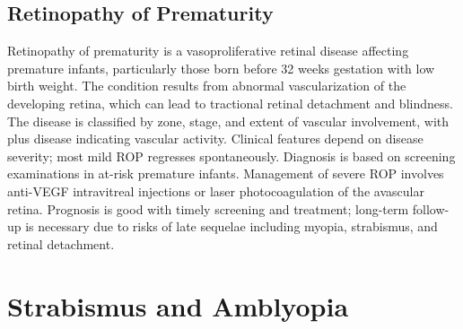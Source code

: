 \subsection{Retinopathy of Prematurity}
\label{sec:Retinopathy of Prematurity}
Retinopathy of prematurity is a vasoproliferative retinal disease affecting premature infants, particularly those born before 32 weeks gestation with low birth weight. The condition results from abnormal vascularization of the developing retina, which can lead to tractional retinal detachment and blindness. The disease is classified by zone, stage, and extent of vascular involvement, with plus disease indicating vascular activity. Clinical features depend on disease severity; most mild ROP regresses spontaneously. Diagnosis is based on screening examinations in at-risk premature infants. Management of severe ROP involves anti-VEGF intravitreal injections or laser photocoagulation of the avascular retina. Prognosis is good with timely screening and treatment; long-term follow-up is necessary due to risks of late sequelae including myopia, strabismus, and retinal detachment.

\section{Strabismus and Amblyopia}








\label{sec:Strabismus and Amblyopia}

